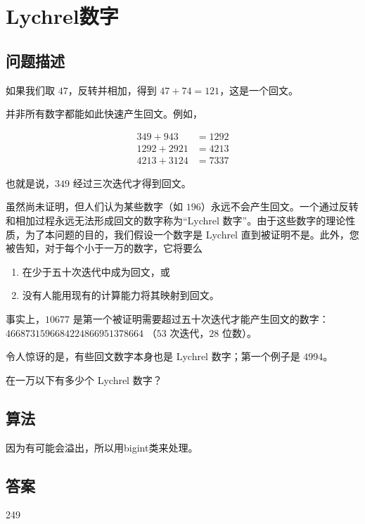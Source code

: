 \section{Lychrel数字}
\subsection{问题描述}
\begin{tcolorbox}
	如果我们取 $47$，反转并相加，得到 $47 + 74 = 121$，这是一个回文。

	并非所有数字都能如此快速产生回文。例如，

	\begin{align}
		349 + 943   & = 1292 \\
		1292 + 2921 & = 4213 \\
		4213 + 3124 & = 7337
	\end{align}

	也就是说，$349$ 经过三次迭代才得到回文。

	虽然尚未证明，但人们认为某些数字（如 $196$）永远不会产生回文。一个通过反转和相加过程永远无法形成回文的数字称为“Lychrel 数字”。由于这些数字的理论性质，为了本问题的目的，我们假设一个数字是 Lychrel 直到被证明不是。此外，您被告知，对于每个小于一万的数字，它将要么
	\begin{enumerate}[label={(\roman*)}]
		\item 在少于五十次迭代中成为回文，或
		\item 没有人能用现有的计算能力将其映射到回文。
	\end{enumerate}
	事实上，$10677$ 是第一个被证明需要超过五十次迭代才能产生回文的数字：$4668731596684224866951378664$ （$53$ 次迭代，$28$ 位数）。

	令人惊讶的是，有些回文数字本身也是 Lychrel 数字；第一个例子是 $4994$。

	在一万以下有多少个 Lychrel 数字？
\end{tcolorbox}

\subsection{算法}
因为有可能会溢出，所以用bigint类来处理。

\subsection{答案}
249
